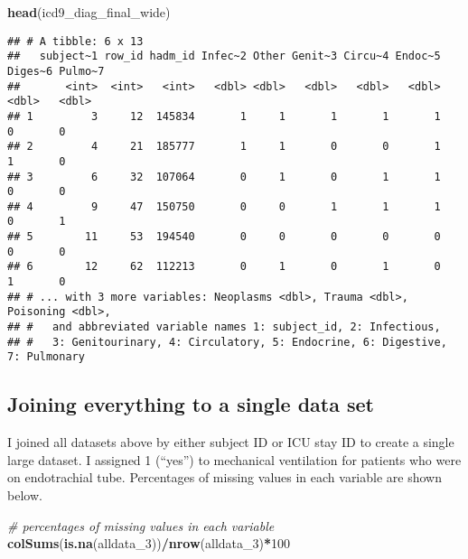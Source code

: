 \documentclass[
]{article}
\newenvironment{Shaded}{\begin{snugshade}}{\end{snugshade}}
\newcommand{\CommentTok}[1]{\textcolor[rgb]{0.56,0.35,0.01}{\textit{#1}}}
\newcommand{\DecValTok}[1]{\textcolor[rgb]{0.00,0.00,0.81}{#1}}
\newcommand{\FunctionTok}[1]{\textcolor[rgb]{0.13,0.29,0.53}{\textbf{#1}}}
\newcommand{\NormalTok}[1]{#1}
\newcommand{\SpecialCharTok}[1]{\textcolor[rgb]{0.81,0.36,0.00}{\textbf{#1}}}
\begin{document}
\begin{Shaded}
\begin{Highlighting}[]
\FunctionTok{head}\NormalTok{(icd9\_diag\_final\_wide)}
\end{Highlighting}
\end{Shaded}

\begin{verbatim}
## # A tibble: 6 x 13
##   subject~1 row_id hadm_id Infec~2 Other Genit~3 Circu~4 Endoc~5 Diges~6 Pulmo~7
##       <int>  <int>   <int>   <dbl> <dbl>   <dbl>   <dbl>   <dbl>   <dbl>   <dbl>
## 1         3     12  145834       1     1       1       1       1       0       0
## 2         4     21  185777       1     1       0       0       1       1       0
## 3         6     32  107064       0     1       0       1       1       0       0
## 4         9     47  150750       0     0       1       1       1       0       1
## 5        11     53  194540       0     0       0       0       0       0       0
## 6        12     62  112213       0     1       0       1       0       1       0
## # ... with 3 more variables: Neoplasms <dbl>, Trauma <dbl>, Poisoning <dbl>,
## #   and abbreviated variable names 1: subject_id, 2: Infectious,
## #   3: Genitourinary, 4: Circulatory, 5: Endocrine, 6: Digestive, 7: Pulmonary
\end{verbatim}

\hypertarget{joining-everything-to-a-single-data-set}{%
\subsection{Joining everything to a single data
set}\label{joining-everything-to-a-single-data-set}}

I joined all datasets above by either subject ID or ICU stay ID to
create a single large dataset. I assigned 1 (``yes'') to mechanical
ventilation for patients who were on endotrachial tube. Percentages of
missing values in each variable are shown below.

\begin{Shaded}
\begin{Highlighting}[]
\CommentTok{\# percentages of missing values in each variable}
\FunctionTok{colSums}\NormalTok{(}\FunctionTok{is.na}\NormalTok{(alldata\_3))}\SpecialCharTok{/}\FunctionTok{nrow}\NormalTok{(alldata\_3)}\SpecialCharTok{*}\DecValTok{100}
\end{Highlighting}
\end{Shaded}
\end{document}
